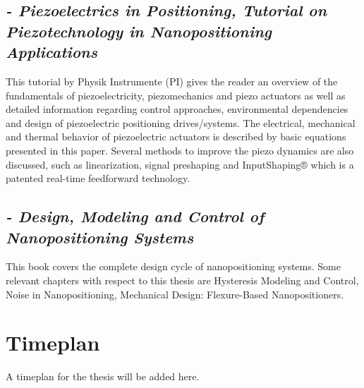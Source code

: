 \subsection*{\citep*{Piezo:2008} {\small \emph{- Piezoelectrics in Positioning, Tutorial on Piezotechnology in Nanopositioning Applications}} }
This tutorial by Physik Instrumente (PI) gives the reader an overview of the fundamentals of piezoelectricity, piezomechanics and piezo actuators as well as detailed information regarding control approaches, environmental dependencies and design of piezoelectric positioning drives/systems. The electrical, mechanical and thermal behavior of piezoelectric actuators is described by basic equations presented in this paper. Several methods to improve the piezo dynamics are also discussed, such as linearization, signal preshaping and InputShaping® which is a patented real-time feedforward technology.

\subsection*{\citep*{FlemingLeang:2014} {\small \emph{- Design, Modeling and Control of Nanopositioning Systems}} }
This book covers the complete design cycle of nanopositioning systems. Some relevant chapters with respect to this thesis are Hysteresis Modeling and Control, Noise in Nanopositioning, Mechanical Design: Flexure-Based Nanopositioners. 


\section{Timeplan}
A timeplan for the thesis will be added here.
